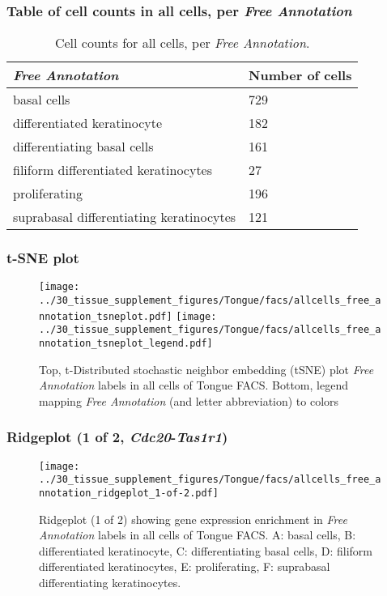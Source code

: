 \subsubsection{Table of cell counts in all cells, per \emph{Free Annotation}}\begin{table}[h]
\centering
\label{my-label}
\begin{tabular}{@{}ll@{}}
\toprule

\emph{Free Annotation}& Number of cells \\ \midrule
basal cells & 729 \\

differentiated keratinocyte & 182 \\

differentiating basal cells & 161 \\

filiform differentiated keratinocytes & 27 \\

proliferating & 196 \\

suprabasal differentiating keratinocytes & 121 \\
\bottomrule
\end{tabular}
\caption{Cell counts for all cells, per \emph{Free Annotation}.}
\end{table}

\clearpage
\subsubsection{t-SNE plot}
\begin{figure}[h]
\centering
\texttt{[image: ../30\_tissue\_supplement\_figures/Tongue/facs/allcells\_free\_annotation\_tsneplot.pdf]}
\texttt{[image: ../30\_tissue\_supplement\_figures/Tongue/facs/allcells\_free\_annotation\_tsneplot\_legend.pdf]}
\caption{Top, t-Distributed stochastic neighbor embedding (tSNE) plot  \emph{Free Annotation} labels in all cells of Tongue FACS. Bottom, legend mapping \emph{Free Annotation} (and letter abbreviation) to colors}
\end{figure}


\clearpage

\subsubsection{Ridgeplot (1 of 2, \emph{Cdc20}-\emph{Tas1r1})}
\begin{figure}[h]
\centering
\texttt{[image: ../30\_tissue\_supplement\_figures/Tongue/facs/allcells\_free\_annotation\_ridgeplot\_1-of-2.pdf]}

\caption{ Ridgeplot (1 of 2)  showing gene expression enrichment in \emph{Free Annotation} labels in all cells of Tongue FACS. A: basal cells, B: differentiated keratinocyte, C: differentiating basal cells, D: filiform differentiated keratinocytes, E: proliferating, F: suprabasal differentiating keratinocytes.}
\end{figure}


